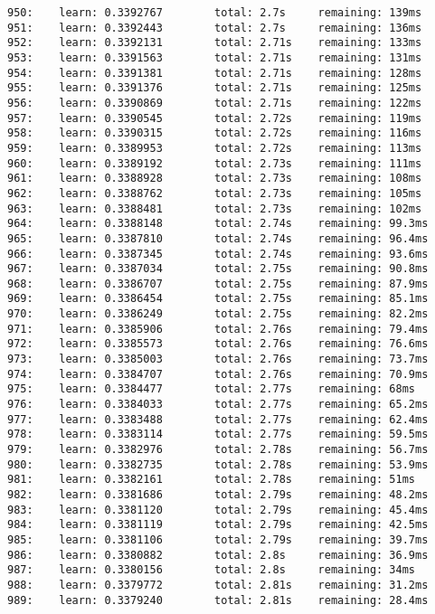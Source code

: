 \documentclass[11pt]{article}
\begin{document}
\begin{Verbatim}[commandchars=\\\{\}]
950:    learn: 0.3392767        total: 2.7s     remaining: 139ms
951:    learn: 0.3392443        total: 2.7s     remaining: 136ms
952:    learn: 0.3392131        total: 2.71s    remaining: 133ms
953:    learn: 0.3391563        total: 2.71s    remaining: 131ms
954:    learn: 0.3391381        total: 2.71s    remaining: 128ms
955:    learn: 0.3391376        total: 2.71s    remaining: 125ms
956:    learn: 0.3390869        total: 2.71s    remaining: 122ms
957:    learn: 0.3390545        total: 2.72s    remaining: 119ms
958:    learn: 0.3390315        total: 2.72s    remaining: 116ms
959:    learn: 0.3389953        total: 2.72s    remaining: 113ms
960:    learn: 0.3389192        total: 2.73s    remaining: 111ms
961:    learn: 0.3388928        total: 2.73s    remaining: 108ms
962:    learn: 0.3388762        total: 2.73s    remaining: 105ms
963:    learn: 0.3388481        total: 2.73s    remaining: 102ms
964:    learn: 0.3388148        total: 2.74s    remaining: 99.3ms
965:    learn: 0.3387810        total: 2.74s    remaining: 96.4ms
966:    learn: 0.3387345        total: 2.74s    remaining: 93.6ms
967:    learn: 0.3387034        total: 2.75s    remaining: 90.8ms
968:    learn: 0.3386707        total: 2.75s    remaining: 87.9ms
969:    learn: 0.3386454        total: 2.75s    remaining: 85.1ms
970:    learn: 0.3386249        total: 2.75s    remaining: 82.2ms
971:    learn: 0.3385906        total: 2.76s    remaining: 79.4ms
972:    learn: 0.3385573        total: 2.76s    remaining: 76.6ms
973:    learn: 0.3385003        total: 2.76s    remaining: 73.7ms
974:    learn: 0.3384707        total: 2.76s    remaining: 70.9ms
975:    learn: 0.3384477        total: 2.77s    remaining: 68ms
976:    learn: 0.3384033        total: 2.77s    remaining: 65.2ms
977:    learn: 0.3383488        total: 2.77s    remaining: 62.4ms
978:    learn: 0.3383114        total: 2.77s    remaining: 59.5ms
979:    learn: 0.3382976        total: 2.78s    remaining: 56.7ms
980:    learn: 0.3382735        total: 2.78s    remaining: 53.9ms
981:    learn: 0.3382161        total: 2.78s    remaining: 51ms
982:    learn: 0.3381686        total: 2.79s    remaining: 48.2ms
983:    learn: 0.3381120        total: 2.79s    remaining: 45.4ms
984:    learn: 0.3381119        total: 2.79s    remaining: 42.5ms
985:    learn: 0.3381106        total: 2.79s    remaining: 39.7ms
986:    learn: 0.3380882        total: 2.8s     remaining: 36.9ms
987:    learn: 0.3380156        total: 2.8s     remaining: 34ms
988:    learn: 0.3379772        total: 2.81s    remaining: 31.2ms
989:    learn: 0.3379240        total: 2.81s    remaining: 28.4ms

\end{Verbatim}
\end{document}
